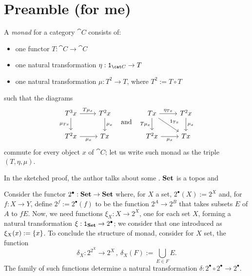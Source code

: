 
\section{Preamble (for me)}


A {\em monad} for a category \(\cat C\) consists of:
\begin{itemize}
\item one functor \(T :  \cat C \to \cat C\)
\item one natural transformation \(\eta : \id_{\cat C} \to T\)
\item one natural transformation \(\mu : T^2 \to T\), where \(T^2 := T \circ T\)
\end{itemize}
such that the diagrams
\[\begin{tikzcd}
T^3 x \ar["{T\mu_x}", r] \ar["{\mu_{T x}}", d, swap] & T^2 x \ar["{\mu_x}", d] \\
T^2 x \ar["{\mu_x}", r, swap] & T x
\end{tikzcd} \quad\text{and}\quad \begin{tikzcd}
T x \ar["{\eta_{T x}}", r] \ar["{\id_{T x}}", dr] \ar["{T\mu_x}", d, swap] & T^2 x \ar["{\mu_x}", d] \\
T^2 x \ar["{\mu_x}", r, swap] & T x
\end{tikzcd}\]
commute for every object \(x\) of \(\cat C\); let us write such monad as the triple \((T, \eta, \mu)\).

In the sketched proof, the author talks about some . \(\mathbf{Set}\) is a topos and

\begin{sandbox}
Consider the functor \(2^\bullet : \mathbf{Set} \to \mathbf{Set}\) where, for \(X\) a set, \(2^\bullet(X) := 2^X\) and, for \(f : X \to Y\), define \(2^f := 2^\bullet(f)\)  to be the function \(2^A \to 2^B\) that takes subsets \(E\) of \(A\) to \(fE\).\newline
Now, we need functions \(\xi_X : X \to 2^X\), one for each set \(X\), forming a natural transformation \(\xi : \operatorname{\mathtt 1}_{\mathbf{Set}} \to 2^\bullet\); we consider that one introduced as \(\xi_X (x) := \left\{x\right\}\).\newline
To conclude the structure of monad, consider for \(X\) set, the function
\[\delta_X : 2^{2^X} \to 2^X\,, \ \delta_X (F) := \bigcup_{E \in F} E .\]
The family of such functions determine a natural transformation \(\delta : 2^\bullet \circ 2^\bullet \to 2^\bullet\).
\end{sandbox}

